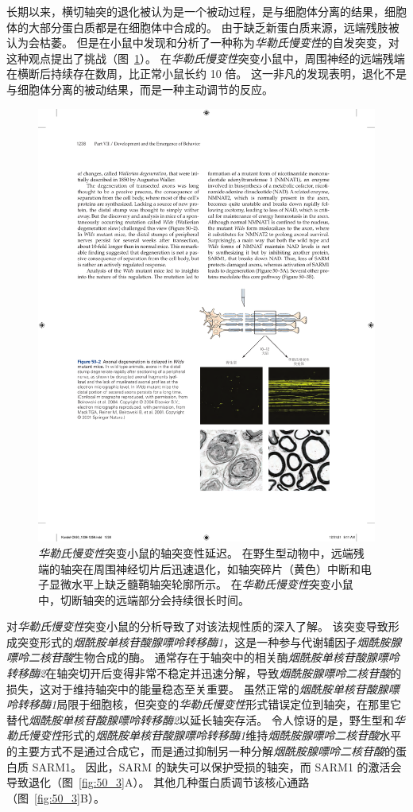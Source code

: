 长期以来，横切轴突的退化被认为是一个被动过程，是与细胞体分离的结果，细胞体的大部分蛋白质都是在细胞体中合成的。
由于缺乏新蛋白质来源，远端残肢被认为会枯萎。
但是在小鼠中发现和分析了一种称为\textit{华勒氏慢变性}的自发突变，对这种观点提出了挑战（图~\ref{fig:50_2}）。 
在\textit{华勒氏慢变性}突变小鼠中，周围神经的远端残端在横断后持续存在数周，比正常小鼠长约 10 倍。
这一非凡的发现表明，退化不是与细胞体分离的被动结果，而是一种主动调节的反应。


\begin{figure}[htbp]
	\centering
	\includegraphics[width=0.7\linewidth]{chap50/fig_50_2}
	\caption{\textit{华勒氏慢变性}突变小鼠的轴突变性延迟。
		在野生型动物中，远端残端的轴突在周围神经切片后迅速退化，如轴突碎片（黄色）中断和电子显微水平上缺乏髓鞘轴突轮廓所示。
		在\textit{华勒氏慢变性}突变小鼠中，切断轴突的远端部分会持续很长时间\cite{beirowski2004quantitative}。}
	\label{fig:50_2}
\end{figure}


对\textit{华勒氏慢变性}突变小鼠的分析导致了对该法规性质的深入了解。
该突变导致形成突变形式的\textit{烟酰胺单核苷酸腺嘌呤转移酶1}，这是一种参与代谢辅因子\textit{烟酰胺腺嘌呤二核苷酸}生物合成的酶。
通常存在于轴突中的相关酶\textit{烟酰胺单核苷酸腺嘌呤转移酶2}在轴突切开后变得非常不稳定并迅速分解，导致\textit{烟酰胺腺嘌呤二核苷酸}的损失，这对于维持轴突中的能量稳态至关重要。
虽然正常的\textit{烟酰胺单核苷酸腺嘌呤转移酶1}局限于细胞核，但突变的\textit{华勒氏慢变性}形式错误定位到轴突，在那里它替代\textit{烟酰胺单核苷酸腺嘌呤转移酶2}以延长轴突存活。
令人惊讶的是，野生型和\textit{华勒氏慢变性}形式的\textit{烟酰胺单核苷酸腺嘌呤转移酶1}维持\textit{烟酰胺腺嘌呤二核苷酸}水平的主要方式不是通过合成它，而是通过抑制另一种分解\textit{烟酰胺腺嘌呤二核苷酸}的蛋白质 SARM1。
因此，SARM 的缺失可以保护受损的轴突，而 SARM1 的激活会导致退化（图~\ref{fig:50_3}A）。
其他几种蛋白质调节该核心通路（图~\ref{fig:50_3}B）。


